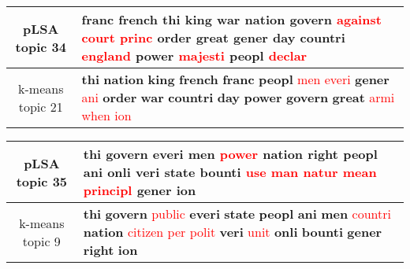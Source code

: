 \begin{center}\begin{tabularx}{\textwidth} {
  | c | >{\raggedright\arraybackslash}X | } \hline 
pLSA topic 34 & \textbf{franc} \textbf{french} \textbf{thi} \textbf{king} \textbf{war} \textbf{nation} \textbf{govern} \textcolor{red}{against} \textcolor{red}{court} \textcolor{red}{princ} \textbf{order} \textbf{great} \textbf{gener} \textbf{day} \textbf{countri} \textcolor{red}{england} \textbf{power} \textcolor{red}{majesti} \textbf{peopl} \textcolor{red}{declar} \\ \hline 
k-means topic 21 & \textbf{thi} \textbf{nation} \textbf{king} \textbf{french} \textbf{franc} \textbf{peopl} \textcolor{red}{men} \textcolor{red}{everi} \textbf{gener} \textcolor{red}{ani} \textbf{order} \textbf{war} \textbf{countri} \textbf{day} \textbf{power} \textbf{govern} \textbf{great} \textcolor{red}{armi} \textcolor{red}{when} \textcolor{red}{ion} \\ \hline 
\end{tabularx}

\end{center}

\begin{center}\begin{tabularx}{\textwidth} {
  | c | >{\raggedright\arraybackslash}X | } \hline 
pLSA topic 35 & \textbf{thi} \textbf{govern} \textbf{everi} \textbf{men} \textcolor{red}{power} \textbf{nation} \textbf{right} \textbf{peopl} \textbf{ani} \textbf{onli} \textbf{veri} \textbf{state} \textbf{bounti} \textcolor{red}{use} \textcolor{red}{man} \textcolor{red}{natur} \textcolor{red}{mean} \textcolor{red}{principl} \textbf{gener} \textbf{ion} \\ \hline 
k-means topic 9 & \textbf{thi} \textbf{govern} \textcolor{red}{public} \textbf{everi} \textbf{state} \textbf{peopl} \textbf{ani} \textbf{men} \textcolor{red}{countri} \textbf{nation} \textcolor{red}{citizen} \textcolor{red}{per} \textcolor{red}{polit} \textbf{veri} \textcolor{red}{unit} \textbf{onli} \textbf{bounti} \textbf{gener} \textbf{right} \textbf{ion} \\ \hline 
\end{tabularx}

\end{center}

